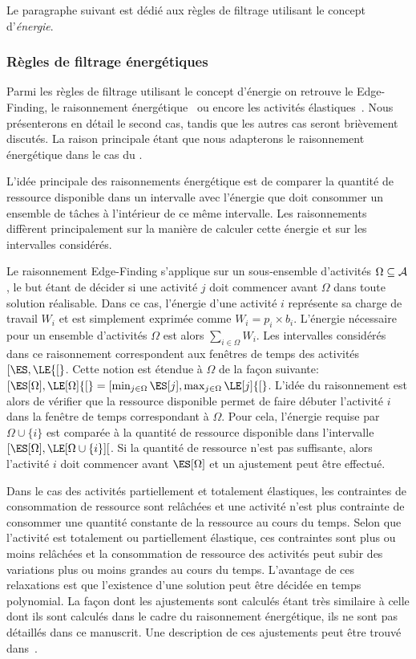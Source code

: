 Le paragraphe suivant est dédié aux règles de filtrage utilisant le
concept d'{\it énergie}. 
 
\subsubsection{Règles de filtrage énergétiques}
 \label{sec:nrj_CUSP}
Parmi les règles de filtrage utilisant le concept d'énergie on
retrouve le Edge-Finding\cite{VilimEF,theseNuijten}, le raisonnement
énergétique~\cite{RELopez} ou encore les activités
élastiques~\cite{BLPN}.  Nous présenterons en détail le second cas,
tandis que les autres cas seront brièvement discutés. La raison
principale étant que nous adapterons le raisonnement énergétique dans
le cas du \CECSP.

L'idée principale des raisonnements énergétique est de comparer la
quantité de ressource disponible dans un intervalle avec l'énergie que
doit consommer un ensemble de tâches à l'intérieur de ce même
intervalle. Les raisonnements diffèrent principalement sur la manière
de calculer cette énergie et sur les intervalles considérés. 

 Le raisonnement Edge-Finding s'applique sur un sous-ensemble
d'activités $\Omega \subseteq {\cal A}$, le but étant de décider si une
activité $j$ doit commencer avant $\Omega$ dans toute solution
réalisable. Dans ce cas, l'énergie d'une activité $i$ représente sa
charge de travail $W_i$ et est simplement exprimée comme
$W_i=p_i\times b_i$. L'énergie nécessaire pour un ensemble d'activités
$\Omega$ est alors $\sum_{i\in \Omega} W_i$. Les intervalles
considérés dans ce raisonnement correspondent aux fenêtres de temps des
activités $[\ES,\LE{[}$. Cette notion est étendue à $\Omega$ de la façon
suivante: $[\ES[\Omega],\LE[\Omega]{[}=[\min_{j \in \Omega}\ES[j],\max_{j
\in \Omega} \LE[j] {[}$. L'idée du raisonnement est alors  de vérifier
que la ressource disponible permet de faire débuter l'activité $i$
dans la fenêtre de temps correspondant à $\Omega$. Pour cela,
l'énergie requise par $\Omega \cup \{ i\}$ est comparée à la quantité
de ressource disponible dans l'intervalle $[\ES[\Omega],\LE[\Omega\cup
\{i\}]{[}$. Si la quantité de ressource n'est pas suffisante, alors
l'activité $i$ doit commencer avant $\ES[\Omega]$ et un ajustement
peut être effectué.

Dans le cas des activités partiellement et totalement élastiques, les
contraintes de consommation de ressource sont relâchées et une
activité n'est plus contrainte de consommer une quantité constante de
la ressource au cours du temps. Selon que l'activité est totalement
ou partiellement élastique, ces contraintes sont plus ou moins
relâchées et la consommation de ressource des activités peut subir des
variations plus ou moins grandes au cours du temps. L'avantage de ces
relaxations est que l'existence d'une solution peut être décidée en
temps polynomial. La façon dont les ajustements sont calculés étant
très similaire à celle dont ils sont calculés dans le cadre du
raisonnement énergétique, ils ne sont pas détaillés dans ce
manuscrit. Une description de ces ajustements peut être trouvé
dans~\cite{BLN}. 

